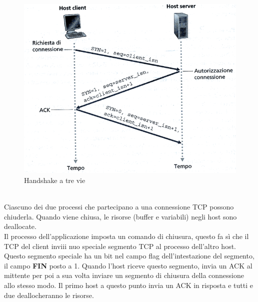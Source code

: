 \documentclass[11pt,a4paper]{article}
\begin{document}
\begin{figure}
	\includegraphics[scale=0.6]{img/035.png}
	\caption{Handshake a tre vie}
\end{figure}
\\
Ciascuno dei due processi che partecipano a una connessione TCP possono chiuderla. Quando viene chiusa, le risorse (buffer e variabili) negli host sono deallocate. \\
Il processo dell'applicazione imposta un comando di chiusura, questo fa sì che il TCP del client inviii nuo speciale segmento TCP al processo dell'altro host. Questo segmento speciale ha un bit nel campo flag dell'intestazione del segmento, il campo \textbf{FIN} posto a 1. Quando l'host riceve questo segmento, invia un ACK al mittente per poi a sua volta inviare un segmento di chiusura della connessione allo stesso modo. Il primo host a questo punto invia un ACK in risposta e tutti e due deallocheranno le risorse. \\
\end{document}
